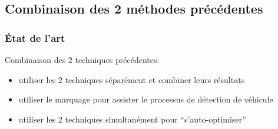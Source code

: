 \subsection{Combinaison des 2 méthodes précédentes}
\begin{frame}
\frametitle{État de l'art}

Combinaison des 2 techniques précédentes:
\begin{itemize}
    \item utiliser les 2 techniques séparément et combiner leurs résultats
    \item utiliser le marquage pour assister le processus de détection de véhicule
    \item utiliser les 2 techniques simultanément pour ``s'auto-optimiser''
\end{itemize}

\end{frame}
